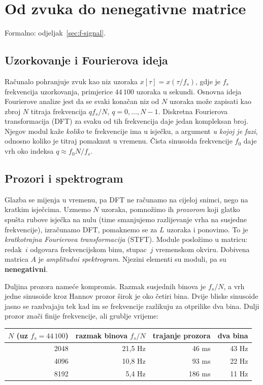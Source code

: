 \documentclass[11pt,a4paper]{article}
\theoremstyle{definition}
\theoremstyle{plain}
\theoremstyle{remark}
\newcommand{\formalno}[1]{{\small\color{muted}\sffamily Formalno: odjeljak~\ref{#1}.}\par}
\begin{document}
\section{Od zvuka do nenegativne matrice}\label{sec:i-spektrogram}
\formalno{sec:f-signal}

\subsection{Uzorkovanje i Fourierova ideja}

Računalo pohranjuje zvuk kao niz uzoraka $x[\tau]=x(\tau/f_s)$, gdje je $f_s$ frekvencija
uzorkovanja, primjerice $44\,100$ uzoraka u sekundi. Osnovna ideja Fourierove analize jest da se
svaki konačan niz od $N$ uzoraka može zapisati kao zbroj $N$ titraja frekvencija $q f_s/N$,
$q=0,\dots,N-1$. Diskretna Fourierova transformacija (DFT) za svaku od tih frekvencija daje jedan
kompleksan broj. Njegov modul kaže \emph{koliko} te frekvencije ima u isječku, a argument
\emph{u kojoj je fazi}, odnosno koliko je titraj pomaknut u vremenu. Čista sinusoida frekvencije
$f_0$ daje vrh oko indeksa $q\approx f_0 N/f_s$.

\subsection{Prozori i spektrogram}

Glazba se mijenja u vremenu, pa DFT ne računamo na cijeloj snimci, nego na kratkim isječcima.
Uzmemo $N$ uzoraka, pomnožimo ih \emph{prozorom} koji glatko spušta rubove isječka na nulu
(time smanjujemo razlijevanje vrha na susjedne frekvencije), izračunamo DFT, pomaknemo se za $L$
uzoraka i ponovimo. To je \emph{kratkotrajna Fourierova transformacija} (STFT). Module posložimo u
matricu: redak~$i$ odgovara frekvencijskom binu, stupac~$j$ vremenskom okviru. Dobivena matrica
$A$ je \emph{amplitudni spektrogram}. Njezini elementi su moduli, pa su \textbf{nenegativni}.

Duljina prozora nameće kompromis. Razmak susjednih binova je $f_s/N$, a vrh jedne sinusoide kroz
Hannov prozor širok je oko četiri bina. Dvije bliske sinusoide jasno se razdvajaju tek kad im se
frekvencije razlikuju za otprilike dva bina. Dulji prozor znači finije frekvencije, ali grublje
vrijeme:

\begin{center}
\small
\begin{tabular}{@{}rrrr@{}}
\toprule
$N$ (uz $f_s=44\,100$) & razmak binova $f_s/N$ & trajanje prozora & dva bina\\
\midrule
2048 & 21,5 Hz & 46 ms & 43 Hz\\
4096 & 10,8 Hz & 93 ms & 22 Hz\\
8192 & 5,4 Hz & 186 ms & 11 Hz\\
\bottomrule
\end{tabular}
\end{center}
\end{document}
